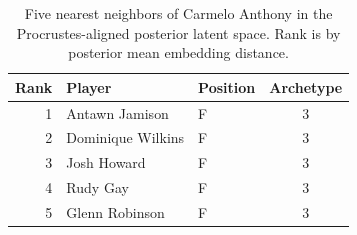 \begin{table}[htbp]
  \centering\small
  \begin{tabular}{rllc}
    \toprule
    Rank & Player & Position & Archetype \\
    \midrule
    1 & Antawn Jamison & F & 3 \\
    2 & Dominique Wilkins & F & 3 \\
    3 & Josh Howard & F & 3 \\
    4 & Rudy Gay & F & 3 \\
    5 & Glenn Robinson & F & 3 \\
    \bottomrule
  \end{tabular}
  \caption{Five nearest neighbors of Carmelo Anthony in the Procrustes-aligned posterior latent space. Rank is by posterior mean embedding distance.}
  \label{tab:Carmelo_Anthony_neighbors}
\end{table}

